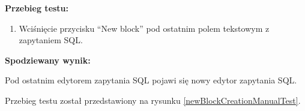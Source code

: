 \begin{enumerate}
\begin{enumerate}
                \textbf{Przebieg testu:}

                \begin{enumerate}

                    \item Wciśnięcie przycisku ``New block'' pod ostatnim
                        polem tekstowym z zapytaniem SQL.

                \end{enumerate}

                \textbf{Spodziewany wynik:}

                Pod ostatnim edytorem zapytania SQL pojawi się nowy edytor
                zapytania SQL.

                Przebieg testu został przedstawiony na rysunku \ref{newBlockCreationManualTest}.

                \begin{figure}[h]
                    \centering

                    \medspace


\end{figure}
\end{enumerate}
\end{enumerate}
